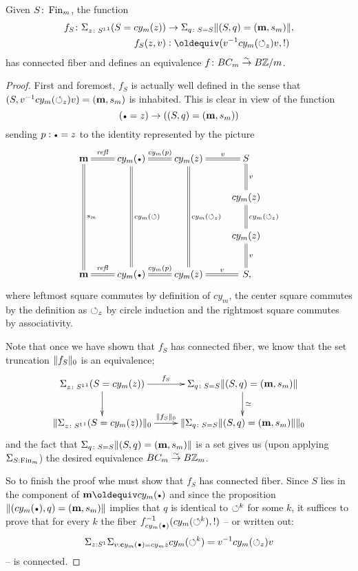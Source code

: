 \begin{example}
\begin{lemma}
  Given $S\colon\operatorname{Fin}_m$, the function 
  \begin{align*}
    f_S\colon\Sigma_{z\colon\Sc^1}(S=cy_m(z))&\to \Sigma_{q\colon S=S}\Trunc{(S,q)=(\bn m,s_m)},\\
 f_S(z,v)&\defequi (v^{-1}cy_m(\Sloop_z)v,!)
  \end{align*}
  has connected fiber and defines 
 an equivalence $f\colon BC_m\overset\sim\to B\mathbb{Z}/m$.
\end{lemma}
\begin{proof}
  First and foremost, $f_S$ is actually well defined in the sense that $(S,v^{-1}cy_m(\circlearrowleft_z)v)=(\mathbf{m},s_m)$ is inhabited.
  This is clear in view of the function
  $$(\base =z)\to((S,q)=(\bn m,s_m))$$
  sending $p:\base= z$ to the identity represented by the picture
  $$\xymatrix{
    \bn m\ar@{=}[ddd]^{s_m}\ar@{=}[r]^-{\refl{} }& cy_m(\base)\ar@{=}[ddd]^{cy_m(\Sloop)}\ar@{=}[r]^{cy_m(p)}&cy_m(z)\ar@{=}[ddd]^{cy_m(\Sloop_z)}\ar@{=}[r]^-v&S\ar@{=}[d]^-v\\
    &&&cy_m(z)\ar@{=}[d]^{cy_m(\Sloop_z)}\\
     &&&cy_m(z)\ar@{=}[d]^-v\\
     \bn m\ar@{=}[r]^-{\refl{} }& cy_m(\base)\ar@{=}[r]^{cy_m(p)}&cy_m(z)\ar@{=}[r]^-v&\,S,}
  $$
  where leftmost square commutes by definition of $cy_m$, the center square commutes by the definition as $\circlearrowleft_z$ by circle induction and the rightmost square commutes by associativity.

  Note that  once we have shown that $f_S$ has connected fiber, we know that the set truncation $\lVert f_S\rVert_0$ is an equivalence;
  $$\xymatrix{\Sigma_{z\colon\Sc^1}(S=cy_m(z))\ar[r]^-{f_S}\ar[d]& \Sigma_{q\colon S=S}\Trunc{(S,q)=(\bn m,s_m)}\ar[d]^{\simeq}\\
 \Trunc{\Sigma_{z\colon\Sc^1}(S=cy_m(z))}_0\ar[r]^-{\Trunc{f_S}_0}& \Trunc{\Sigma_{q\colon S=S}\Trunc{(S,q)=(\bn m,s_m)}}_0 }
  $$ and the fact that $\Sigma_{q\colon S=S}\lVert(S,q)=(\mathbf{m},s_m)\rVert$ is a set gives us (upon applying $\Sigma_{S:\operatorname{Fin}_m}$) the desired equivalence $BC_m\overset\sim\to B\mathbb{Z}_m$.

  So to finish the proof whe must show that $f_S$ has connected fiber.
  Since $S$ lies in the component of $\bn m\oldequiv cy_m(\base)$ and since the proposition $\Trunc{(cy_m(\base),q)=(\bn m,s_m)}$ implies that $q$ is identical to $\circlearrowleft^k$ for some $k$, it suffices to prove that for every $k$ the fiber
  $f_{cy_m(\base)}^{-1}(cy_m(\Sloop^k),!)$ -- or written out:
  $$\Sigma_{z:S^1}\Sigma_{v:\bn cy_m(\base)=cy_m z}cy_m(\Sloop^k)=v^{-1}cy_m(\Sloop_z)v$$
   -- is connected.


\end{proof}
\end{example}
